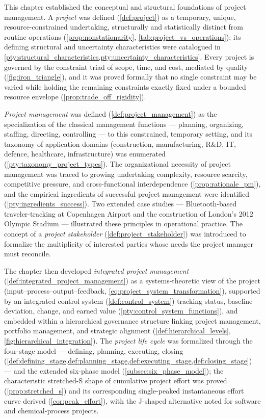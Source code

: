 \documentclass[12pt, a4paper]{report}
\theoremstyle{engnotes}
\begin{document}
This chapter established the conceptual and structural foundations of project management. A \emph{project} was defined (\cref{def:project}) as a temporary, unique, resource-constrained undertaking, structurally and statistically distinct from routine operations (\cref{prop:nonstationarity}, \cref{tab:project_vs_operations}); its defining structural and uncertainty characteristics were catalogued in \cref{pty:structural_characteristics,pty:uncertainty_characteristics}. Every project is governed by the constraint triad of scope, time, and cost, mediated by quality (\cref{fig:iron_triangle}), and it was proved formally that no single constraint may be varied while holding the remaining constraints exactly fixed under a bounded resource envelope (\cref{prop:trade_off_rigidity}).

\emph{Project management} was defined (\cref{def:project_management}) as the specialization of the classical management functions --- planning, organizing, staffing, directing, controlling --- to this constrained, temporary setting, and its taxonomy of application domains (construction, manufacturing, R\&D, IT, defence, healthcare, infrastructure) was enumerated (\cref{pty:taxonomy_project_types}). The organizational necessity of project management was traced to growing undertaking complexity, resource scarcity, competitive pressure, and cross-functional interdependence (\cref{prop:rationale_pm}), and the empirical ingredients of successful project management were identified (\cref{pty:ingredients_success}). Two extended case studies --- Bluetooth-based traveler-tracking at Copenhagen Airport and the construction of London's 2012 Olympic Stadium --- illustrated these principles in operational practice. The concept of a \emph{project stakeholder} (\cref{def:project_stakeholder}) was introduced to formalize the multiplicity of interested parties whose needs the project manager must reconcile.

The chapter then developed \emph{integrated project management} (\cref{def:integrated_project_management}) as a systems-theoretic view of the project (input--process--output--feedback, \cref{eq:project_system_transformation}), supported by an integrated control system (\cref{def:control_system}) tracking status, baseline deviation, change, and earned value (\cref{pty:control_system_functions}), and embedded within a hierarchical governance structure linking project management, portfolio management, and strategic alignment (\cref{def:hierarchical_levels}, \cref{fig:hierarchical_integration}). The \emph{project life cycle} was formalized through the four-stage model --- defining, planning, executing, closing (\cref{def:defining_stage,def:planning_stage,def:executing_stage,def:closing_stage}) --- and the extended six-phase model (\cref{subsec:six_phase_model}); the characteristic stretched-S shape of cumulative project effort was proved (\cref{prop:stretched_s}) and its corresponding single-peaked instantaneous effort curve derived (\cref{cor:peak_effort}), with the J-shaped alternative noted for software and chemical-process projects.
\end{document}
